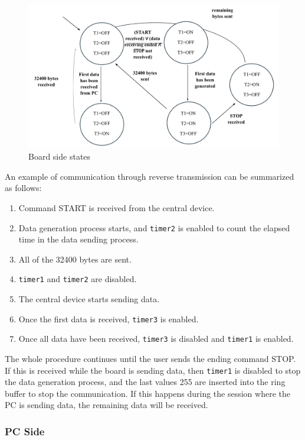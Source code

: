 \documentclass{Configuration_Files/PoliMi3i_thesis}
\begin{document}
\begin{figure}[H]
    \centering
    \includegraphics[scale=0.6]{Board Windows PC/10.png}
    \caption{Board side states}
    \label{boardwindows_10}
\end{figure}

An example of communication through reverse transmission can be summarized as follows:

\begin{enumerate}
    \item Command START is received from the central device.
    \item Data generation process starts, and \texttt{timer2} is enabled to count the elapsed time in the data sending process.
    \item All of the 32400 bytes are sent.
    \item \texttt{timer1} and \texttt{timer2} are disabled.
    \item The central device starts sending data.
    \item Once the first data is received, \texttt{timer3} is enabled.
    \item Once all data have been received, \texttt{timer3} is disabled and \texttt{timer1} is enabled.
\end{enumerate}

The whole procedure continues until the user sends the ending command STOP. If this is received while the board is sending data, then \texttt{timer1} is disabled to stop the data generation process, and the last values 255 are inserted into the ring buffer to stop the communication. If this happens during the session where the PC is sending data, the remaining data will be received.

\subsubsection{PC Side}
\end{document}
